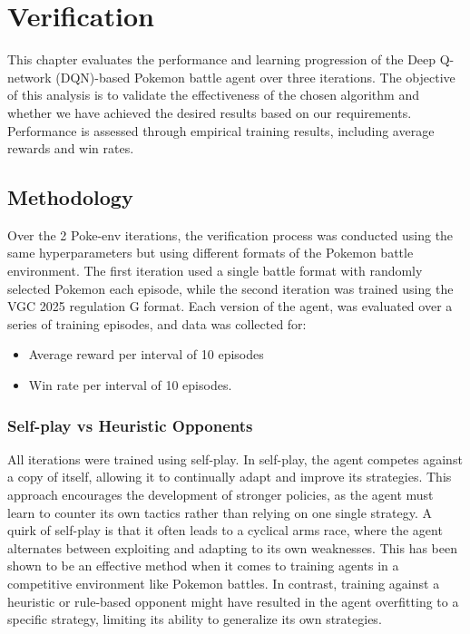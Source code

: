\section{Verification}
\label{sec:verification}

This chapter evaluates the performance and learning progression of the Deep Q-network
(DQN)-based Pokemon battle agent over three iterations. The objective of this analysis
is to validate the effectiveness of the chosen algorithm and whether we have achieved
the desired results based on our requirements. Performance is assessed through empirical
training results, including average rewards and win rates.

\subsection{Methodology}
Over the 2 Poke-env iterations, the verification process was conducted using the same hyperparameters
but using different formats of the Pokemon battle environment.
The first iteration used a single battle format with randomly selected Pokemon each
episode, while the second iteration was trained using the VGC 2025 regulation G format.
Each version of the agent, was evaluated over a series of training episodes, and data
was collected for:
\begin{itemize}
    \item Average reward per interval of 10 episodes
    \item Win rate per interval of 10 episodes.
\end{itemize}

\subsubsection{Self-play vs Heuristic Opponents}
All iterations were trained using self-play. In self-play, the agent competes against a copy of itself, allowing it to 
continually adapt and improve its strategies. This approach encourages the development of stronger policies, as the agent 
must learn to counter its own tactics rather than relying on one single strategy. 
A quirk of self-play is that it often leads to a cyclical arms race, where the agent alternates between exploiting and adapting
to its own weaknesses. This has been shown to be an effective method when it comes to training agents in a competitive environment \cite{pmlr-v119-bai20a} like
Pokemon battles. In contrast, training against a heuristic or rule-based opponent might have resulted in the agent overfitting to
a specific strategy, limiting its ability to generalize its own strategies.

